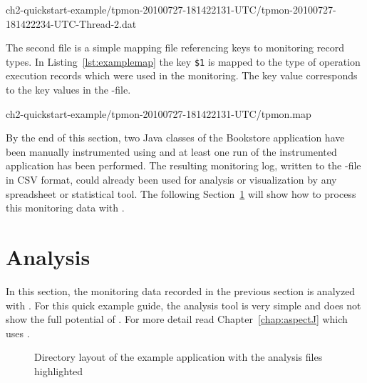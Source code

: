\setBashListing
%
{ch2-quickstart-example/tpmon-20100727-181422131-UTC/tpmon-20100727-181422234-UTC-Thread-2.dat}

\noindent The second file is a simple mapping file referencing keys to monitoring record types. In Listing~\ref{lst:examplemap} the key \verb!$1! is mapped to the type of operation execution records which were used in the monitoring. The key value corresponds to the key values in the -file.

%
{ch2-quickstart-example/tpmon-20100727-181422131-UTC/tpmon.map}

\noindent By the end of this section, two Java classes of the Bookstore application %
have been manually instrumented using \KiekerMonitoringPart{} and at least one %
run of the instrumented application has been performed. %
The resulting monitoring log, written to the -file in CSV format, could %
already been used for analysis or visualization by any spreadsheet or %
statistical tool. %
The following Section~\ref{sec:example:analysis} will show how to process %
this monitoring data with \KiekerAnalysisPart{}. 

\section{Analysis}\label{sec:example:analysis}

In this section, the monitoring data recorded in the previous section is %
analyzed with \KiekerAnalysisPart{}. %
For this quick example guide, the analysis tool is very simple and does not show %
the full potential of \Kieker{}. For more detail read Chapter~\ref{chap:aspectJ} %
which uses \KiekerTraceAnalysis{}.

\begin{figure}[H]
\begin{graybox}
\end{graybox}
\caption{Directory layout of the example application with the analysis files highlighted}
\label{lst:analysisExampleLayout}
\end{figure}


